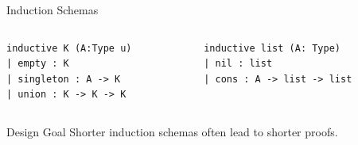 \documentclass[aspectratio=169]{beamer}
\begin{document}
\begin{frame}[fragile]{Induction Schemas}
    \begin{columns}[T]
        \begin{column}{0.5\textwidth}
            \begin{lstlisting}
inductive K (A:Type u)
| empty : K
| singleton : A -> K
| union : K -> K -> K
            \end{lstlisting}
        \end{column}
        
        \begin{column}{0.5\textwidth}
            \begin{lstlisting}
inductive list (A: Type)
| nil : list
| cons : A -> list -> list
            \end{lstlisting}
        \end{column}
    \end{columns}
    \pause
    \begin{block}{Design Goal}
        Shorter induction schemas often lead to shorter proofs.
    \end{block}
\end{frame}
\end{document}
